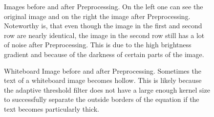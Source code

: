 \documentclass[11pt]{article}
\begin{document}
\begin{figure}[htp]
		\quad
		
		\caption{Images before and after Preprocessing.
		On the left one can see the original image and on the right the image after Preprocessing.
		Noteworthy is, that even though the image in the first and second row are nearly identical, the image in the second row still has a lot of noise after Preprocessing.
		This is due to the high brightness gradient and because of the darkness of certain parts of the image.}
		\label{fig:PreprocessingExamples}
	\end{figure}
	
		\begin{figure}[htp]
		\centering
		\quad
		
		
		\caption{Whiteboard Image before and after Preprocessing.
		Sometimes the text of a whiteboard image becomes hollow.
		This is likely because the adaptive threshold filter does not have a large enough kernel size to successfully separate the outside borders of the equation if the text becomes particularly thick.}
		\label{fig:HollowWhiteboardImage}
	\end{figure}
	
\end{document}
